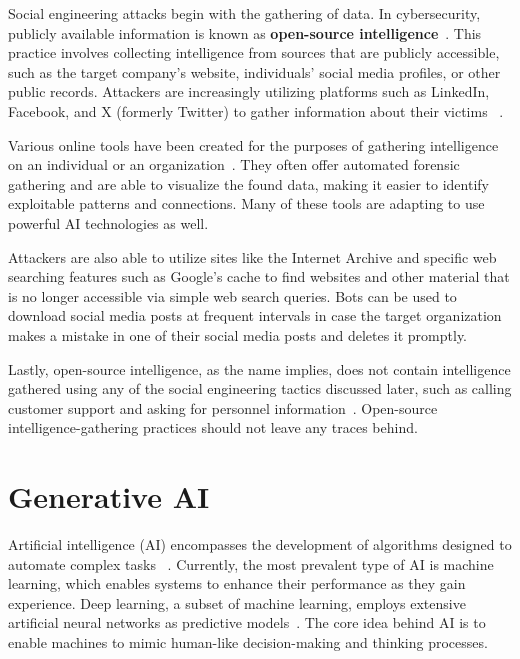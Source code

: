 Social engineering attacks begin with the gathering of data. In cybersecurity, publicly available information is known as \textbf{open-source intelligence}~\citep{hadnagy_Social_Engineering_The_Science_2018}. This practice involves collecting intelligence from sources that are publicly accessible, such as the target company's website, individuals' social media profiles, or other public records. Attackers are increasingly utilizing platforms such as LinkedIn, Facebook, and X (formerly Twitter) to gather information about their victims ~\citep{fakhouri_AI_Driven_Solutions_SE_Attacks_2024}.

Various online tools have been created for the purposes of gathering intelligence on an individual or an organization~\citep{mirsky_Threat_Offensive_AI_Organizations_2023}. They often offer automated forensic gathering and are able to visualize the found data, making it easier to identify exploitable patterns and connections. Many of these tools are adapting to use powerful AI technologies as well.

Attackers are also able to utilize sites like the Internet Archive and specific web searching features such as Google’s cache to find websites and other material that is no longer accessible via simple web search queries. Bots can be used to download social media posts at frequent intervals in case the target organization makes a mistake in one of their social media posts and deletes it promptly.

Lastly, open-source intelligence, as the name implies, does not contain intelligence gathered using any of the social engineering tactics discussed later, such as calling customer support and asking for personnel information~\citep{hadnagy_Social_Engineering_The_Science_2018}. Open-source intelligence-gathering practices should not leave any traces behind.





\section{Generative AI}
\begin{comment}
\end{comment}

Artificial intelligence (AI) encompasses the development of algorithms designed to automate complex tasks ~\citep{mirsky_Threat_Offensive_AI_Organizations_2023}. Currently, the most prevalent type of AI is machine learning, which enables systems to enhance their performance as they gain experience. Deep learning, a subset of machine learning, employs extensive artificial neural networks as predictive models~\citep{fakhouri_AI_Driven_Solutions_SE_Attacks_2024}. The core idea behind AI is to enable machines to mimic human-like decision-making and thinking processes.

